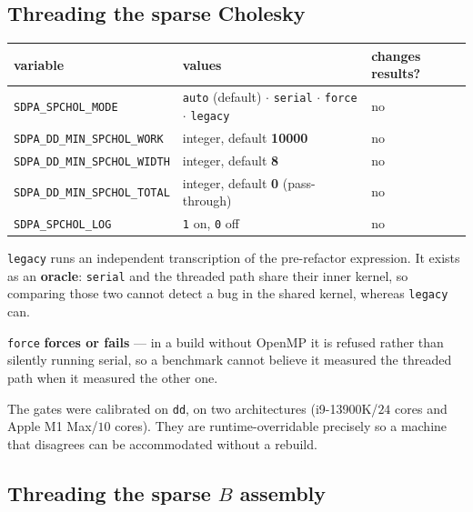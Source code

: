 \documentclass[11pt]{article}
\newcommand{\bMat}{B}
\newcommand{\code}[1]{\texttt{#1}}
\begin{document}
\subsection{Threading the sparse Cholesky}

\begin{center}\small
\begin{tabular}{@{}p{5.1cm}p{5.6cm}l@{}}
\toprule
variable & values & changes results? \\
\midrule
\code{SDPA\_SPCHOL\_MODE} & \code{auto} (default) $\cdot$ \code{serial} $\cdot$ \code{force}
  $\cdot$ \code{legacy} & no \\
\code{SDPA\_DD\_MIN\_SPCHOL\_WORK}  & integer, default \textbf{10000} & no \\
\code{SDPA\_DD\_MIN\_SPCHOL\_WIDTH} & integer, default \textbf{8} & no \\
\code{SDPA\_DD\_MIN\_SPCHOL\_TOTAL} & integer, default \textbf{0} (pass-through) & no \\
\code{SDPA\_SPCHOL\_LOG} & \code{1} on, \code{0} off & no \\
\bottomrule
\end{tabular}
\end{center}

\code{legacy} runs an independent transcription of the pre-refactor expression. It exists as an
\textbf{oracle}: \code{serial} and the threaded path share their inner kernel, so comparing those
two cannot detect a bug in the shared kernel, whereas \code{legacy} can.

\code{force} \textbf{forces or fails} --- in a build without OpenMP it is refused rather than
silently running serial, so a benchmark cannot believe it measured the threaded path when it
measured the other one.

The gates were calibrated on \code{dd}, on two architectures (i9-13900K/$24$ cores and Apple M1
Max/$10$ cores). They are runtime-overridable precisely so a machine that disagrees can be
accommodated without a rebuild.

\subsection{Threading the sparse \texorpdfstring{$\bMat$}{bMat} assembly}
\end{document}
